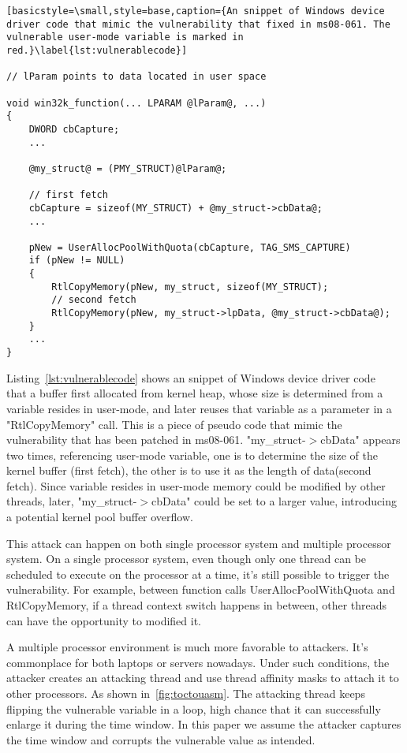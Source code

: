 \begin{lstlisting}[basicstyle=\small,style=base,caption={An snippet of Windows device driver code that mimic the vulnerability that fixed in ms08-061. The vulnerable user-mode variable is marked in red.}\label{lst:vulnerablecode}]

// lParam points to data located in user space

void win32k_function(... LPARAM @lParam@, ...) 
{
    DWORD cbCapture;
    ...

    @my_struct@ = (PMY_STRUCT)@lParam@;

    // first fetch
    cbCapture = sizeof(MY_STRUCT) + @my_struct->cbData@;  
    ...

    pNew = UserAllocPoolWithQuota(cbCapture, TAG_SMS_CAPTURE)
    if (pNew != NULL) 
    {
        RtlCopyMemory(pNew, my_struct, sizeof(MY_STRUCT);
        // second fetch
        RtlCopyMemory(pNew, my_struct->lpData, @my_struct->cbData@);   
    }
    ...
}

\end{lstlisting}

Listing~\ref{lst:vulnerablecode} shows an snippet of Windows device driver code~\cite{jurczyk2013identifying} that a buffer first allocated from kernel heap, whose size is determined from a variable resides in user-mode, and later reuses that variable as a parameter in a "RtlCopyMemory" call. This is a piece of pseudo code that mimic the vulnerability that has been patched in ms08-061. "my_struct-$>$cbData" appears two times, referencing user-mode variable, one is to determine the size of the kernel buffer (first fetch), the other is to use it as the length of data(second fetch). Since variable resides in user-mode memory could be modified by other threads, later, "my_struct-$>$cbData" could be set to a larger value, introducing a potential kernel pool buffer overflow.

This attack can happen on both single processor system and multiple processor system. On a single processor system, even though only one thread can be scheduled to execute on the processor at a time, it's still possible to trigger the vulnerability. For example, between function calls UserAllocPoolWithQuota and RtlCopyMemory, if a thread context switch happens in between, other threads can have the opportunity to modified it.

A multiple processor environment is much more favorable to attackers. It's commonplace for both laptops or servers nowadays. Under such conditions, the attacker creates an attacking thread and use thread affinity masks to attach it to other processors. As shown in~\autoref{fig:toctouasm}. The attacking thread keeps flipping the vulnerable variable in a loop, high chance that it can successfully enlarge it during the time window. In this paper we assume the attacker captures the time window and corrupts the vulnerable value as intended. 

